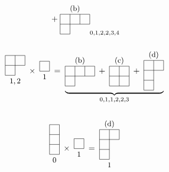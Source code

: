 \begin{xiti}
\begin{equation*}
\begin{gathered}
{  \;+\;
  \vcenter{\hbox{%
  \begin{picture}(36,36)
    \yh{0}{0}{12}\yh{0}{12}{36}\yh{0}{24}{36}\yv{0}{0}{24}\yv{12}{0}{24}\yv{24}{12}{12}\yv{36}{12}{12}%
    \ybl{18}{26}{(b)}%
  \end{picture}}}}_{0,1,2,2,3,4}\\[1.6em]
  \vcenter{\hbox{%
  \begin{picture}(24,38)
    \yh{0}{14}{12}\yh{0}{26}{24}\yh{0}{38}{24}\yv{0}{14}{24}\yv{12}{14}{24}\yv{24}{26}{12}%
    \ytl{12}{10}{$1,2$}%
  \end{picture}}}%
  \;\times\;
  \vcenter{\hbox{%
  \begin{picture}(12,24)
    \yh{0}{12}{12}\yh{0}{24}{12}\yv{0}{12}{12}\yv{12}{12}{12}%
    \ytl{6}{8}{$1$}%
  \end{picture}}}%
  \;=\;
  \underbrace{%
  \vcenter{\hbox{%
  \begin{picture}(36,36)
    \yh{0}{0}{12}\yh{0}{12}{36}\yh{0}{24}{36}\yv{0}{0}{24}\yv{12}{0}{24}\yv{24}{12}{12}\yv{36}{12}{12}%
    \ybl{18}{26}{(b)}%
  \end{picture}}}%
  \;+\;
  \vcenter{\hbox{%
  \begin{picture}(24,36)
    \yh{0}{0}{24}\yh{0}{12}{24}\yh{0}{24}{24}\yv{0}{0}{24}\yv{12}{0}{24}\yv{24}{0}{24}%
    \ybl{12}{26}{(c)}%
  \end{picture}}}%
  \;+\;
  \vcenter{\hbox{%
  \begin{picture}(24,46)
    \yh{0}{0}{12}\yh{0}{12}{12}\yh{0}{24}{24}\yh{0}{36}{24}\yv{0}{0}{36}\yv{12}{0}{36}\yv{24}{24}{12}%
    \ybl{12}{38}{(d)}%
  \end{picture}}}}_{0,1,1,2,2,3}\\[1.6em]
  \vcenter{\hbox{%
  \begin{picture}(12,58)
    \yh{0}{22}{12}\yh{0}{34}{12}\yh{0}{46}{12}\yh{0}{58}{12}\yv{0}{22}{36}\yv{12}{22}{36}%
    \ytl{6}{18}{$0$}%
  \end{picture}}}%
  \;\times\;
  \vcenter{\hbox{%
  \begin{picture}(12,24)
    \yh{0}{12}{12}\yh{0}{24}{12}\yv{0}{12}{12}\yv{12}{12}{12}%
    \ytl{6}{8}{$1$}%
  \end{picture}}}%
  \;=\;
  \vcenter{\hbox{%
  \begin{picture}(24,70)
    \yh{0}{22}{12}\yh{0}{34}{12}\yh{0}{46}{24}\yh{0}{58}{24}\yv{0}{22}{36}\yv{12}{22}{36}\yv{24}{46}{12}%
    \ybl{12}{60}{(d)}\ytl{12}{18}{$1$}%
  \end{picture}}}
\end{gathered}
\end{equation*}

\end{xiti}
